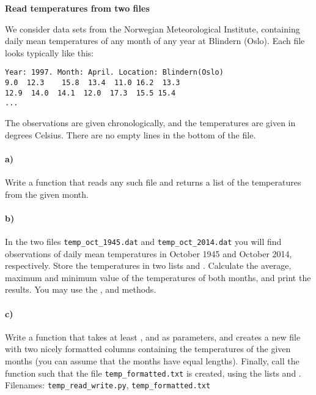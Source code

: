 \begin{Problem}{\textbf{Read temperatures from two files}} 

\noindent
We consider data sets from the Norwegian Meteorological Institute, containing daily mean temperatures of any month of any year at Blindern (Oslo).\cite{temp} Each file looks typically like this:
\begin{lstlisting}
Year: 1997. Month: April. Location: Blindern(Oslo)
9.0  12.3    15.8  13.4  11.0 16.2  13.3
12.9  14.0  14.1  12.0  17.3  15.5 15.4
...
\end{lstlisting}
The observations are given chronologically, and the temperatures are given in degrees Celsius. There are no empty lines in the bottom of the file.

\paragraph{a)}
Write a function  that reads any such file and returns a list of the temperatures from the given month.
\paragraph{b)}
In the two files \texttt{temp\_oct\_1945.dat} and \texttt{temp\_oct\_2014.dat} you will find observations of daily mean temperatures in October 1945 and October 2014, respectively. Store the temperatures in two lists  and . Calculate the average, maximum and minimum value of the temperatures of both months, and print the results. You may use the ,  and  methods. 
\paragraph{c)}
Write a function  that takes at least ,  and  as parameters, and creates a new file with two nicely formatted columns containing the temperatures of the given months (you can assume that the months have equal lengths). 
Finally, call the function such that the file \texttt{temp\_formatted.txt} is created, using the lists  and .
\\
Filenames: \texttt{temp\_read\_write.py}, \texttt{temp\_formatted.txt}

\end{Problem}